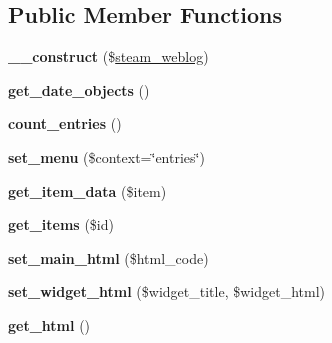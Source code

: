 \subsection*{Public Member Functions}
\begin{DoxyCompactItemize}
\item 
\hypertarget{classlms__weblog_a70d7385b9d6a5f614c3574ce9299a5c5}{
{\bfseries \_\-\_\-construct} (\$\hyperlink{classsteam__weblog}{steam\_\-weblog})}
\label{classlms__weblog_a70d7385b9d6a5f614c3574ce9299a5c5}

\item 
\hypertarget{classlms__weblog_a7cc12d31c47abf9d690818a67fed3c58}{
{\bfseries get\_\-date\_\-objects} ()}
\label{classlms__weblog_a7cc12d31c47abf9d690818a67fed3c58}

\item 
\hypertarget{classlms__weblog_a94fa453f78d97bdbca9f5d01f47c04bf}{
{\bfseries count\_\-entries} ()}
\label{classlms__weblog_a94fa453f78d97bdbca9f5d01f47c04bf}

\item 
\hypertarget{classlms__weblog_ac7d9077ad5441c79e0c9cbecd4968551}{
{\bfseries set\_\-menu} (\$context=\char`\"{}entries\char`\"{})}
\label{classlms__weblog_ac7d9077ad5441c79e0c9cbecd4968551}

\item 
\hypertarget{classlms__weblog_a0a609866a63c4fc6dbbbd4d3acf72904}{
{\bfseries get\_\-item\_\-data} (\$item)}
\label{classlms__weblog_a0a609866a63c4fc6dbbbd4d3acf72904}

\item 
\hypertarget{classlms__weblog_a34fdd8f4a2c5322a14a727b09cb74097}{
{\bfseries get\_\-items} (\$id)}
\label{classlms__weblog_a34fdd8f4a2c5322a14a727b09cb74097}

\item 
\hypertarget{classlms__weblog_a1670c0be60b9421a2b5af73c6262403d}{
{\bfseries set\_\-main\_\-html} (\$html\_\-code)}
\label{classlms__weblog_a1670c0be60b9421a2b5af73c6262403d}

\item 
\hypertarget{classlms__weblog_a959cb0e7502b7a6288f3a024cdadecf2}{
{\bfseries set\_\-widget\_\-html} (\$widget\_\-title, \$widget\_\-html)}
\label{classlms__weblog_a959cb0e7502b7a6288f3a024cdadecf2}

\item 
\hypertarget{classlms__weblog_aad3175ce3abdb3022632fe4a66a5deb6}{
{\bfseries get\_\-html} ()}
\label{classlms__weblog_aad3175ce3abdb3022632fe4a66a5deb6}


\end{DoxyCompactItemize}
